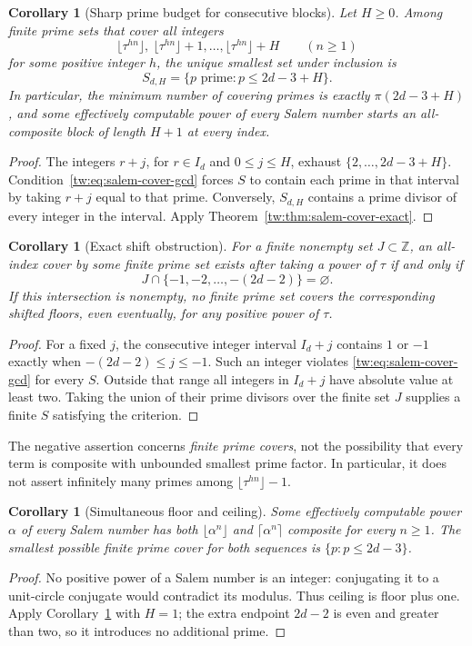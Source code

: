 \documentclass[11pt,a4paper]{article}
\newtheorem{corollary}[theorem]{Corollary}
\theoremstyle{definition}
\theoremstyle{remark}
\numberwithin{equation}{section}
\begin{document}
\begin{corollary}[Sharp prime budget for consecutive blocks]
\label{tw:cor:salem-block-budget}
Let $H\ge0$.  Among finite prime sets that cover all integers
\[
 \lfloor\tau^{hn}\rfloor,\ \lfloor\tau^{hn}\rfloor+1,\ldots,
 \lfloor\tau^{hn}\rfloor+H\qquad(n\ge1)
\]
for some positive integer $h$, the unique smallest set under inclusion is
\[
 S_{d,H}=\{p\text{ prime}:p\le2d-3+H\}.
\]
In particular, the minimum number of covering primes is exactly
$\pi(2d-3+H)$, and some effectively computable power of every Salem
number starts an all-composite block of length $H+1$ at every index.
\end{corollary}
\begin{proof}
The integers $r+j$, for $r\in I_d$ and $0\le j\le H$, exhaust
$\{2,\ldots,2d-3+H\}$.  Condition~\eqref{tw:eq:salem-cover-gcd} forces
$S$ to contain each prime in that interval by taking $r+j$ equal to
that prime.  Conversely, $S_{d,H}$ contains a prime divisor of every
integer in the interval.  Apply Theorem~\ref{tw:thm:salem-cover-exact}.
\end{proof}

\begin{corollary}[Exact shift obstruction]\label{tw:cor:salem-shift-obstruction}
For a finite nonempty set $J\subset\mathbb Z$, an all-index cover by
some finite prime set exists after taking a power of $\tau$ if and only if
\[
 J\cap\{-1,-2,\ldots,-(2d-2)\}=\varnothing.
\]
If this intersection is nonempty, no finite prime set covers the
corresponding shifted floors, even eventually, for any positive power
of $\tau$.
\end{corollary}
\begin{proof}
For a fixed $j$, the consecutive integer interval $I_d+j$ contains
$1$ or $-1$ exactly when $-(2d-2)\le j\le-1$.  Such an integer violates
\eqref{tw:eq:salem-cover-gcd} for every $S$.  Outside that range all
integers in $I_d+j$ have absolute value at least two.  Taking the union
of their prime divisors over the finite set $J$ supplies a finite
$S$ satisfying the criterion.
\end{proof}

The negative assertion concerns \emph{finite prime covers}, not the
possibility that every term is composite with unbounded smallest prime
factor.  In particular, it does not assert infinitely many primes among
$\lfloor\tau^{hn}\rfloor-1$.

\begin{corollary}[Simultaneous floor and ceiling]\label{tw:cor:salem-floor-ceiling}
Some effectively computable power $\alpha$ of every Salem number has
both $\lfloor\alpha^n\rfloor$ and $\lceil\alpha^n\rceil$ composite for
every $n\ge1$.  The smallest possible finite prime cover for both
sequences is $\{p:p\le2d-3\}$.
\end{corollary}
\begin{proof}
No positive power of a Salem number is an integer: conjugating it to a
unit-circle conjugate would contradict its modulus.  Thus ceiling is
floor plus one.  Apply Corollary~\ref{tw:cor:salem-block-budget} with $H=1$;
the extra endpoint $2d-2$ is even and greater than two, so it introduces
no additional prime.
\end{proof}
\end{document}
